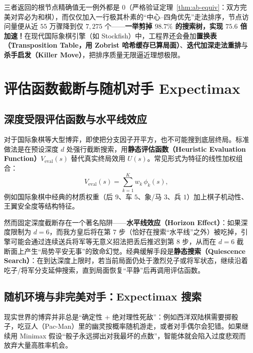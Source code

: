三者返回的根节点精确值无一例外都是 $0$（严格验证定理~\ref{thm:ab-equiv}：双方完美对弈必为和棋），而仅仅加入一行极其朴素的“中心--四角优先”走法排序，节点访问量便从近 $55$ 万骤降到仅 $7{,}275$ 个——\textbf{一举剪掉 $98.7\%$ 的搜索树，实现 $75.6$ 倍加速！}在现代国际象棋引擎（如 Stockfish）中，工程界还会叠加\textbf{置换表（Transposition Table，用 Zobrist 哈希缓存已算局面）}、\textbf{迭代加深走法重排}与\textbf{杀手启发（Killer Move）}，把排序质量无限逼近理想极限。

\section{评估函数截断与随机对手 Expectimax}\label{sec:expectimax}

\subsection{深度受限评估函数与水平线效应}

对于国际象棋等大型博弈，即使把分支因子开平方，也不可能搜到底层终局。标准做法是在预设深度 $d$ 处强行截断搜索，用\textbf{静态评估函数（Heuristic Evaluation Function）}$V_{\text{eval}}(s)$ 替代真实终局效用 $U(s)$。常见形式为特征的线性加权组合：
\begin{equation}\label{eq:eval-fn}
  V_{\text{eval}}(s) = \sum_{k=1}^{K} w_k\, \phi_k(s),
\end{equation}
例如国际象棋中经典的材质权重（后 $9$、车 $5$、象/马 $3$、兵 $1$）加上棋子机动性、王翼安全度等结构特征。

然而固定深度截断存在一个著名陷阱——\textbf{水平线效应（Horizon Effect）}：如果深度限制为 $d=6$，而我方皇后将在第 $7$ 步（恰好在搜索“水平线”之外）被吃掉，引擎可能会通过连续送兵将军等无意义招法把丢后推迟到第 $8$ 步，从而在 $d=6$ 截断面上产生“局势平安无事”的致命幻觉。经典缓解手段是\textbf{静态搜索（Quiescence Search）}：在到达深度上限时，若当前局面仍处于激烈兑子或将军状态，继续沿着吃子/将军分支延伸搜索，直到局面恢复“平静”后再调用评估函数。

\subsection{随机环境与非完美对手：Expectimax 搜索}

现实世界的博弈并非总是“确定性 + 绝对理性死敌”：例如西洋双陆棋需要掷骰子，吃豆人（Pac-Man）里的幽灵按概率随机游走，或者对手偶尔会犯错。如果继续用 Minimax 假设“骰子永远掷出对我最坏的点数”，智能体就会陷入过度悲观而放弃大量高胜率机会。

